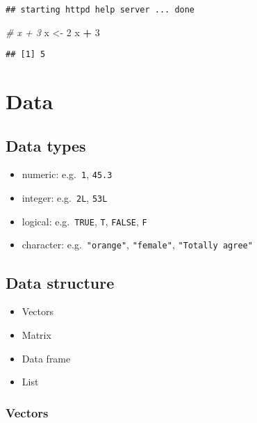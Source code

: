 \documentclass[
  a4paper,
]{article}
\newenvironment{Shaded}{\begin{snugshade}}{\end{snugshade}}
\newcommand{\CommentTok}[1]{\textcolor[rgb]{0.56,0.35,0.01}{\textit{#1}}}
\newcommand{\DecValTok}[1]{\textcolor[rgb]{0.00,0.00,0.81}{#1}}
\newcommand{\NormalTok}[1]{#1}
\newcommand{\OtherTok}[1]{\textcolor[rgb]{0.56,0.35,0.01}{#1}}
\newcommand{\SpecialCharTok}[1]{\textcolor[rgb]{0.81,0.36,0.00}{\textbf{#1}}}
\providecommand{\tightlist}{%
  \setlength{\itemsep}{0pt}\setlength{\parskip}{0pt}}
\begin{document}
\begin{verbatim}
## starting httpd help server ... done
\end{verbatim}

\begin{Shaded}
\begin{Highlighting}[]
\CommentTok{\# x + 3}
\NormalTok{x }\OtherTok{\textless{}{-}} \DecValTok{2}
\NormalTok{x }\SpecialCharTok{+} \DecValTok{3}
\end{Highlighting}
\end{Shaded}

\begin{verbatim}
## [1] 5
\end{verbatim}

\section{Data}\label{data}

\subsection{Data types}\label{data-types}

\begin{itemize}
\tightlist
\item
  numeric: e.g.~\texttt{1}, \texttt{45.3}
\item
  integer: e.g.~\texttt{2L}, \texttt{53L}
\item
  logical: e.g.~\texttt{TRUE}, \texttt{T}, \texttt{FALSE}, \texttt{F}
\item
  character: e.g.~\texttt{"orange"}, \texttt{"female"},
  \texttt{"Totally\ agree"}
\end{itemize}

\subsection{Data structure}\label{data-structure}

\begin{itemize}
\tightlist
\item
  Vectors
\item
  Matrix
\item
  Data frame
\item
  List
\end{itemize}

\subsubsection{Vectors}\label{vectors}
\end{document}
